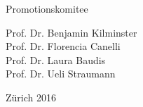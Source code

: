\begin{center}
Promotionskomitee \\
\par
\vspace{0.1in}


Prof. Dr. Benjamin Kilminster\\
Prof. Dr. Florencia Canelli\\
Prof. Dr. Laura Baudis\\
Prof. Dr. Ueli Straumann\\

\par
\vspace{0.4in}


Z\"urich 2016

\end{center}
